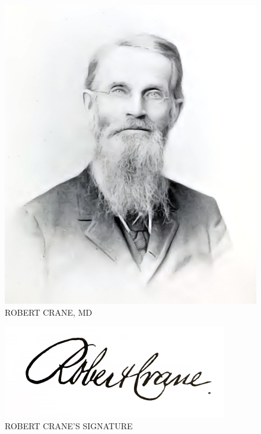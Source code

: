 \documentclass[oneside]{book}
\begin{document}
\begin{figure}[htp]
	\centering
	\includegraphics[scale=0.75]{../white/robertCraneMDWhite.png}
	\caption {ROBERT CRANE, MD}
\end{figure}

\begin{figure}[htp]
	\centering
	\includegraphics[scale=0.75]{../white/robertCraneSignatureWhite.png}
	\caption {ROBERT CRANE'S SIGNATURE}
\end{figure}
\end{document}
